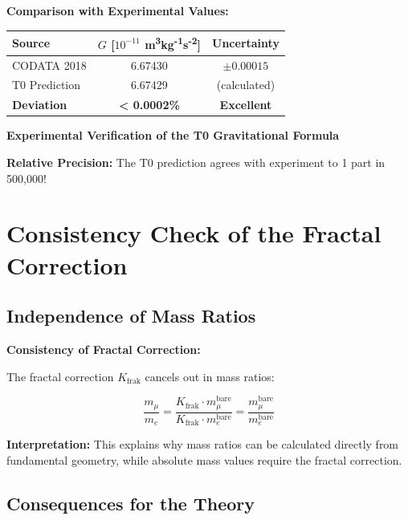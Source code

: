 	\begin{verification}
		\textbf{Comparison with Experimental Values:}
		
		\begin{center}
			\begin{tabular}{lcc}
				\toprule
				\textbf{Source} & \textbf{$G$ [$10^{-11}$ m\textsuperscript{3}kg\textsuperscript{-1}s\textsuperscript{-2}]} & \textbf{Uncertainty} \\
				\midrule
				CODATA 2018 & 6.67430 & $\pm 0.00015$ \\
				T0 Prediction & 6.67429 & (calculated) \\
				\textbf{Deviation} & \textbf{< 0.0002\%} & \textbf{Excellent} \\
				\bottomrule
			\end{tabular}
		\end{center}
		
		\textbf{Experimental Verification of the T0 Gravitational Formula}
		
		\textbf{Relative Precision:} The T0 prediction agrees with experiment to 1 part in 500,000!
	\end{verification}
	
	\section{Consistency Check of the Fractal Correction}
	
	\subsection{Independence of Mass Ratios}
	
	\begin{keyresult}
		\textbf{Consistency of Fractal Correction:}
		
		The fractal correction $K_{\text{frak}}$ cancels out in mass ratios:
		
		\begin{equation}
			\frac{m_\mu}{m_e} = \frac{K_{\text{frak}} \cdot m_\mu^{\text{bare}}}{K_{\text{frak}} \cdot m_e^{\text{bare}}} = \frac{m_\mu^{\text{bare}}}{m_e^{\text{bare}}}
		\end{equation}
		
		\textbf{Interpretation:} 
		This explains why mass ratios can be calculated directly from fundamental geometry, while absolute mass values require the fractal correction.
	\end{keyresult}
	
	\subsection{Consequences for the Theory}
	
